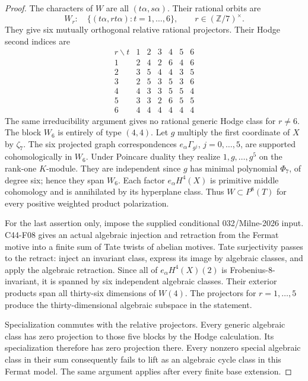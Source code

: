 \documentclass[11pt]{article}
\theoremstyle{remark}\newtheorem{remark}[theorem]{Remark}
\begin{document}
\begin{proof}
The characters of \(W\) are all \((t\alpha,s\alpha)\). Their rational
orbits are
\[
 W_r:\quad\{(t\alpha,rt\alpha):t=1,\ldots,6\},
 \qquad r\in(\mathbb Z/7)^\times.
\]
They give six mutually orthogonal relative rational projectors.
Their Hodge second indices are
\[
\begin{array}{c|rrrrrr}
 r\backslash t&1&2&3&4&5&6\\ \hline
 1&2&4&2&6&4&6\\
 2&3&5&4&4&3&5\\
 3&2&5&3&5&3&6\\
 4&4&3&3&5&5&4\\
 5&3&3&2&6&5&5\\
 6&4&4&4&4&4&4
\end{array}
\]
The same irreducibility argument gives no rational generic Hodge
class for \(r\ne6\). The block \(W_6\) is entirely of type \((4,4)\).
Let \(g\) multiply the first coordinate of \(X\) by \(\zeta _7\).
The six projected graph correspondences \(e_\alpha\Gamma_{g^j}\),
\(j=0,\ldots,5\), are supported cohomologically in \(W_6\).
Under Poincare duality they realize \(1,g,\ldots,g^5\) on the rank-one
\(K\)-module. They are independent since \(g\) has minimal polynomial
\(\Phi_7\), of degree six; hence they span \(W_6\).
Each factor \(e_\alpha H^4(X)\) is primitive middle cohomology and is
annihilated by its hyperplane class. Thus \(W\subset P^8(T)\) for
every positive weighted product polarization.

For the last assertion only, impose the supplied conditional
032/Milne-2026 input. C44-F08 gives an actual algebraic injection and
retraction from the Fermat motive into a finite sum of Tate twists
of abelian motives. Tate surjectivity passes to the retract: inject
an invariant class, express its image by algebraic classes, and
apply the algebraic retraction. Since all of \(e_\alpha H^4(X)(2)\)
is Frobenius-\(8\)-invariant, it is spanned by six independent
algebraic classes. Their exterior products span all thirty-six
dimensions of \(W(4)\). The projectors for \(r=1,\ldots,5\) produce
the thirty-dimensional algebraic subspace in the statement.

Specialization commutes with the relative projectors. Every generic
algebraic class has zero projection to those five blocks by the Hodge
calculation. Its specialization therefore has zero projection there.
Every nonzero special algebraic class in their sum consequently
fails to lift as an algebraic cycle class in this Fermat model.
The same argument applies after every finite base extension.
\end{proof}
\end{document}
